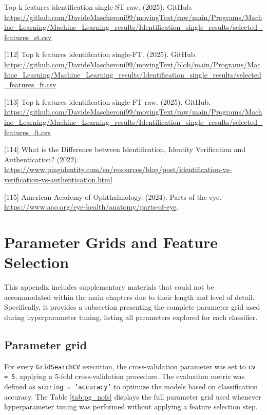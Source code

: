 \documentclass[12pt]{report}
\begin{document}
\begin{raggedright}
[111] Top k features identification single-ST raw. (2025). GitHub. \url{https://github.com/DavideMascheroni99/movingText/raw/main/Programs/Machine_Learning/Machine_Learning_results/Identification_single_results/selected_features_st.csv}

[112] Top k features identification single-FT. (2025). GitHub. \url{https://github.com/DavideMascheroni99/movingText/blob/main/Programs/Machine_Learning/Machine_Learning_results/Identification_single_results/selected_features_ft.csv}

[113] Top k features identification single-FT raw. (2025). GitHub. \url{https://github.com/DavideMascheroni99/movingText/raw/main/Programs/Machine_Learning/Machine_Learning_results/Identification_single_results/selected_features_ft.csv}

[114] What is the Difference between Identification, Identity Verification and Authentication? (2022). \url{https://www.pingidentity.com/en/resources/blog/post/identification-vs-verification-vs-authentication.html}

[115] American Academy of Ophthalmology. (2024). Parts of the eye. \url{https://www.aao.org/eye-health/anatomy/parts-of-eye}.

\end{raggedright}
\clearpage
\newpage

\appendix
\chapter{Parameter Grids and Feature Selection}
\label{subsec:param}


This appendix includes supplementary materials that could not be accommodated within the main chapters due to their length and level of detail. 
Specifically, it provides a subsection presenting the complete parameter grid used during hyperparameter tuning, listing all parameters explored for each classifier. 

\section{Parameter grid}
For every \texttt{GridSearchCV} execution, the cross-validation parameter was set to \texttt{cv = 5}, applying a 5-fold cross-validation procedure.
The evaluation metric was defined as \texttt{scoring = 'accuracy'} to optimize the models based on classification accuracy.
The Table \ref{tab:pg_nofs} displays the full parameter grid used whenever hyperparameter tuning was performed without applying a feature selection step.
\end{document}
